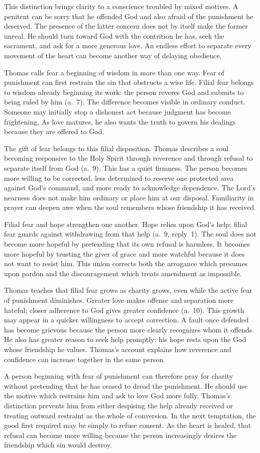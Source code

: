 This distinction brings clarity to a conscience troubled by mixed motives. A penitent can be sorry that he offended God and also afraid of the punishment he deserved. The presence of the latter concern does not by itself make the former unreal. He should turn toward God with the contrition he has, seek the sacrament, and ask for a more generous love. An endless effort to separate every movement of the heart can become another way of delaying obedience.

Thomas calls fear a beginning of wisdom in more than one way. Fear of punishment can first restrain the sin that obstructs a wise life. Filial fear belongs to wisdom already beginning its work: the person reveres God and submits to being ruled by him (a.~7). The difference becomes visible in ordinary conduct. Someone may initially stop a dishonest act because judgment has become frightening. As love matures, he also wants the truth to govern his dealings because they are offered to God.

The gift of fear belongs to this filial disposition. Thomas describes a soul becoming responsive to the Holy Spirit through reverence and through refusal to separate itself from God (a.~9). This has a quiet firmness. The person becomes more willing to be corrected, less determined to reserve one protected area against God's command, and more ready to acknowledge dependence. The Lord's nearness does not make him ordinary or place him at our disposal. Familiarity in prayer can deepen awe when the soul remembers whose friendship it has received.

Filial fear and hope strengthen one another. Hope relies upon God's help; filial fear guards against withdrawing from that help (a.~9, reply~1). The soul does not become more hopeful by pretending that its own refusal is harmless. It becomes more hopeful by trusting the giver of grace and more watchful because it does not want to resist him. This union corrects both the arrogance which presumes upon pardon and the discouragement which treats amendment as impossible.

Thomas teaches that filial fear grows as charity grows, even while the active fear of punishment diminishes. Greater love makes offense and separation more hateful; closer adherence to God gives greater confidence (a.~10). This growth may appear in a quicker willingness to accept correction. A fault once defended has become grievous because the person more clearly recognizes whom it offends. He also has greater reason to seek help promptly: his hope rests upon the God whose friendship he values. Thomas's account explains how reverence and confidence can increase together in the same person.

A person beginning with fear of punishment can therefore pray for charity without pretending that he has ceased to dread the punishment. He should use the motive which restrains him and ask to love God more fully. Thomas's distinction prevents him from either despising the help already received or treating outward restraint as the whole of conversion. In the next temptation, the good first required may be simply to refuse consent. As the heart is healed, that refusal can become more willing because the person increasingly desires the friendship which sin would destroy.

